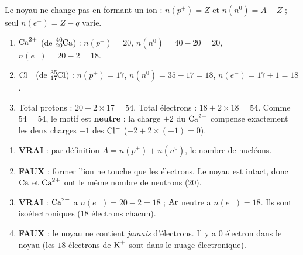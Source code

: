 \documentclass[11pt,a4paper]{article}
\begin{document}
\begin{corrige}
Le noyau ne change pas en formant un ion : $n(p^+)=Z$ et $n(n^0)=A-Z$ ; seul $n(e^-)=Z-q$ varie.
\begin{enumerate}[label=\alph*)]
  \item $\ce{Ca^{2+}}$ (de $\ce{^{40}_{20}Ca}$) : $n(p^+)=20$, $n(n^0)=40-20=20$, $n(e^-)=20-2=18$.
  \item $\ce{Cl^{-}}$ (de $\ce{^{35}_{17}Cl}$) : $n(p^+)=17$, $n(n^0)=35-17=18$, $n(e^-)=17+1=18$.
  \item Total protons : $20 + 2\times17 = 54$. \quad Total électrons : $18 + 2\times18 = 54$.
        Comme $54 = 54$, le motif est \textbf{neutre} : la charge $+2$ du $\ce{Ca^{2+}}$ compense
        exactement les deux charges $-1$ des $\ce{Cl^{-}}$ ($+2 + 2\times(-1) = 0$).
\end{enumerate}
\end{corrige}

\begin{corrige}
\begin{enumerate}[label=\alph*)]
  \item \textbf{\textcolor{excol}{VRAI}} : par définition $A = n(p^+) + n(n^0)$, le nombre de nucléons.
  \item \textbf{\textcolor{attncol}{FAUX}} : former l'ion ne touche que les électrons. Le noyau est
        intact, donc $\ce{Ca}$ et $\ce{Ca^{2+}}$ ont le même nombre de neutrons ($20$).
  \item \textbf{\textcolor{excol}{VRAI}} : $\ce{Ca^{2+}}$ a $n(e^-)=20-2=18$ ; $\ce{Ar}$ neutre a
        $n(e^-)=18$. Ils sont isoélectroniques ($18$ électrons chacun).
  \item \textbf{\textcolor{attncol}{FAUX}} : le noyau ne contient \emph{jamais} d'électrons. Il y a
        $0$ électron dans le noyau (les $18$ électrons de $\ce{K^{+}}$ sont dans le nuage électronique).
\end{enumerate}
\end{corrige}
\end{document}
